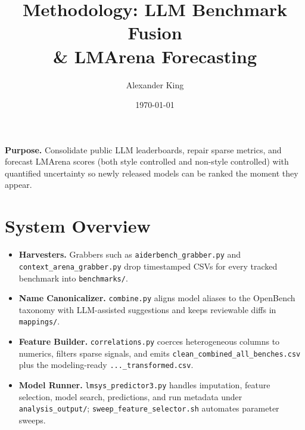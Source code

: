 \documentclass[9pt,twocolumn]{extarticle}
\title{Methodology: LLM Benchmark Fusion \\ \& LMArena Forecasting}
\date{\today}
\author{Alexander King}
\begin{document}
\maketitle
\vspace{-1.3em}

\textbf{Purpose.} Consolidate public LLM leaderboards, repair sparse metrics, and forecast LMArena scores (both style controlled and non-style controlled) with quantified uncertainty so newly released models can be ranked the moment they appear.

\section*{System Overview}
\begin{itemize}
  \item \textbf{Harvesters.} Grabbers such as \texttt{aiderbench\_grabber.py} and \texttt{context\_arena\_grabber.py} drop timestamped CSVs for every tracked benchmark into \texttt{benchmarks/}.
  \item \textbf{Name Canonicalizer.} \texttt{combine.py} aligns model aliases to the OpenBench taxonomy with LLM-assisted suggestions and keeps reviewable diffs in \texttt{mappings/}.
  \item \textbf{Feature Builder.} \texttt{correlations.py} coerces heterogeneous columns to numerics, filters sparse signals, and emits \texttt{clean\_combined\_all\_benches.csv} plus the modeling-ready \texttt{...\_transformed.csv}.
  \item \textbf{Model Runner.} \texttt{lmsys\_predictor3.py} handles imputation, feature selection, model search, predictions, and run metadata under \texttt{analysis\_output/}; \texttt{sweep\_feature\_selector.sh} automates parameter sweeps.
\end{itemize}
\end{document}
